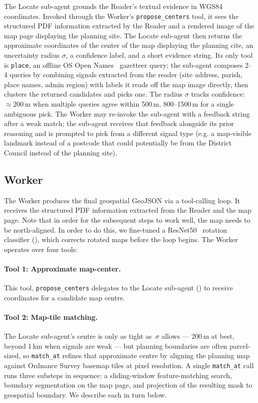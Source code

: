 \documentclass[11pt]{article}
\begin{document}
The Locate sub-agent grounds the Reader's textual evidence in WGS84 coordinates. Invoked through the Worker's \texttt{propose\_centers} tool, it sees the structured PDF information extracted by the Reader and a rendered image of the map page displaying the planning site. The Locate sub-agent then returns the approximate coordinates of the center of the map displaying the planning cite, an uncertainty radius $\sigma$, a confidence label, and a short evidence string. Its only tool is \texttt{place}, an offline OS Open Names~\cite{os_open_names} gazetteer query; the sub-agent composes 2--4 queries by combining signals extracted from the reader (site address, parish, place names, admin region) with labels it reads off the map image directly, then clusters the returned candidates and picks one. The radius $\sigma$ tracks confidence: $\approx 200$\,m when multiple queries agree within 500\,m, 800--1500\,m for a single ambiguous pick.
The Worker may re-invoke the sub-agent with a feedback string after a weak match; the sub-agent receives that feedback alongside its prior reasoning and is prompted to pick from a different signal type (e.g. a map-visible landmark instead of a postcode that could potentially be from the District Council instead of the planning site). 

\subsection{Worker}
\label{subsection:worker}

The Worker produces the final geospatial GeoJSON via a tool-calling loop. It receives the structured PDF information extracted from the Reader and the map page. Note that in order for the subsequent steps to work well, the map needs to be north-aligned. In order to do this, we fine-tuned a ResNet50~\cite{ResNet50} rotation classifier (), which corrects rotated maps before the loop begins. The Worker operates over four tools:

\paragraph{Tool 1: Approximate map-center.}
This tool, \texttt{propose\_centers} delegates to the Locate sub-agent () to receive coordinates for a candidate map centre.

\paragraph{Tool 2: Map-tile matching.}
The Locate sub-agent's centre is only as tight as~$\sigma$ allows --- 200\,m at best, beyond 1\,km when signals are weak --- but planning boundaries are often parcel-sized, so \texttt{match\_at} refines that approximate centre by aligning the planning map against Ordnance Survey basemap tiles at pixel resolution. A single \texttt{match\_at} call runs three substeps in sequence: a sliding-window feature-matching search, boundary segmentation on the map page, and projection of the resulting mask to geospatial boundary. We describe each in turn below.
\end{document}
